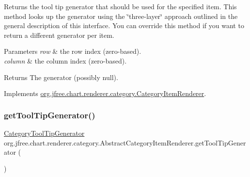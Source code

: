 Returns the tool tip generator that should be used for the specified item. This method looks up the generator using the \char`\"{}three-\/layer\char`\"{} approach outlined in the general description of this interface. You can override this method if you want to return a different generator per item.


\begin{DoxyParams}{Parameters}
{\em row} & the row index (zero-\/based). \\
\hline
{\em column} & the column index (zero-\/based).\\
\hline
\end{DoxyParams}
\begin{DoxyReturn}{Returns}
The generator (possibly {\ttfamily null}). 
\end{DoxyReturn}


Implements \mbox{\hyperlink{interfaceorg_1_1jfree_1_1chart_1_1renderer_1_1category_1_1_category_item_renderer_aaadd626509dd8276e4704cb1d88a74ea}{org.\+jfree.\+chart.\+renderer.\+category.\+Category\+Item\+Renderer}}.

\mbox{\label{classorg_1_1jfree_1_1chart_1_1renderer_1_1category_1_1_abstract_category_item_renderer_a82f173869f7f55aa7ca6bf59a58dac6f}} 
\subsubsection{\texorpdfstring{get\+Tool\+Tip\+Generator()}{getToolTipGenerator()}\hspace{0.1cm}{\footnotesize\ttfamily [2/2]}}
{\footnotesize\ttfamily \mbox{\hyperlink{interfaceorg_1_1jfree_1_1chart_1_1labels_1_1_category_tool_tip_generator}{Category\+Tool\+Tip\+Generator}} org.\+jfree.\+chart.\+renderer.\+category.\+Abstract\+Category\+Item\+Renderer.\+get\+Tool\+Tip\+Generator (\begin{DoxyParamCaption}{ }\end{DoxyParamCaption})}

